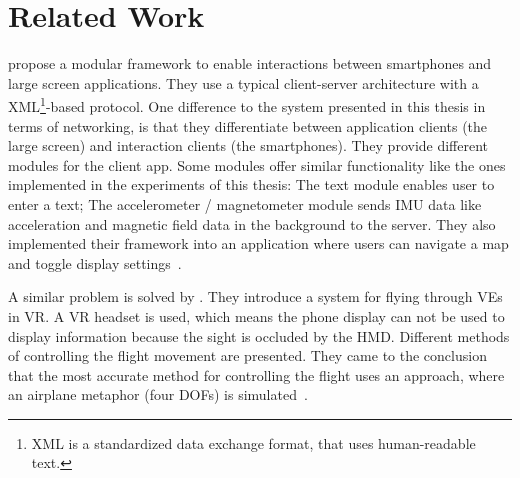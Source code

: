 \chapter{Related Work}\label{chapter:related-work}


\citeauthor{Deller.2011} propose a modular framework to enable interactions between smartphones and large screen applications. They use a typical client-server architecture with a XML\footnote{XML is a standardized data exchange format, that uses human-readable text.}-based protocol. One difference to the system presented in this thesis in terms of networking, is that they differentiate between application clients (the large screen) and interaction clients (the smartphones). They provide different modules for the client app. Some modules offer similar functionality like the ones implemented in the experiments of this thesis: The text module enables user to enter a text; The accelerometer / magnetometer module sends \ac{IMU} data like acceleration and magnetic field data in the background to the server. They also implemented their framework into an application where users can navigate a map and toggle display settings~\cite{Deller.2011}.


A similar problem is solved by \citeauthor{Benzina.2011}. They introduce a system for flying through \acp{VE} in \ac{VR}. A \ac{VR} headset is used, which means the phone display can not be used to display information because the sight is occluded by the \ac{HMD}. Different methods of controlling the flight movement are presented. They came to the conclusion that the most accurate method for controlling the flight uses an approach, where an airplane metaphor (four \acp{DOF}) is simulated~\cite{Benzina.2011}.


